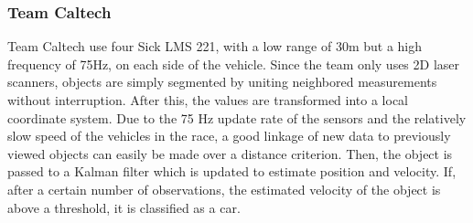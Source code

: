 \documentclass[11pt,oneside,openright]{mpreport}
\begin{document}
\subsubsection{Team Caltech}
Team Caltech \cite{Aly2007} use four Sick LMS 221, with a low range of 30m but a high frequency of 75Hz, on each side of the vehicle. 
Since the team only uses 2D laser scanners, objects are simply segmented by uniting neighbored measurements without interruption. 
After this, the values are transformed into a local coordinate system. Due to the 75 Hz update rate of the sensors and the relatively 
slow speed of the vehicles in the race, a good linkage of new data to previously viewed objects can easily be made over a distance criterion.
Then, the object is passed to a Kalman filter which is updated to estimate position and velocity. If, after a certain number of observations, 
the estimated velocity of the object is above a threshold, it is classified as a car.
\end{document}
